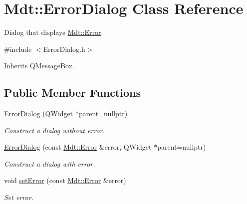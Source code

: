 \hypertarget{class_mdt_1_1_error_dialog}{}\section{Mdt\+:\+:Error\+Dialog Class Reference}
\label{class_mdt_1_1_error_dialog}


Dialog that displays \hyperlink{class_mdt_1_1_error}{Mdt\+::\+Error}.  




{\ttfamily \#include $<$Error\+Dialog.\+h$>$}



Inherits Q\+Message\+Box.

\subsection*{Public Member Functions}
\begin{DoxyCompactItemize}
\item 
\hyperlink{class_mdt_1_1_error_dialog_a75180123982c0d9261a51badd2cc8b35}{Error\+Dialog} (Q\+Widget $\ast$parent=nullptr)\hypertarget{class_mdt_1_1_error_dialog_a75180123982c0d9261a51badd2cc8b35}{}\label{class_mdt_1_1_error_dialog_a75180123982c0d9261a51badd2cc8b35}

\begin{DoxyCompactList}\small\item\em Construct a dialog without error. \end{DoxyCompactList}\item 
\hyperlink{class_mdt_1_1_error_dialog_a5f8bc28282e07d709cd9157bd4425d83}{Error\+Dialog} (const \hyperlink{class_mdt_1_1_error}{Mdt\+::\+Error} \&error, Q\+Widget $\ast$parent=nullptr)\hypertarget{class_mdt_1_1_error_dialog_a5f8bc28282e07d709cd9157bd4425d83}{}\label{class_mdt_1_1_error_dialog_a5f8bc28282e07d709cd9157bd4425d83}

\begin{DoxyCompactList}\small\item\em Construct a dialog with error. \end{DoxyCompactList}\item 
void \hyperlink{class_mdt_1_1_error_dialog_a7b946187592ea21ecefcc278b237f63b}{set\+Error} (const \hyperlink{class_mdt_1_1_error}{Mdt\+::\+Error} \&error)\hypertarget{class_mdt_1_1_error_dialog_a7b946187592ea21ecefcc278b237f63b}{}\label{class_mdt_1_1_error_dialog_a7b946187592ea21ecefcc278b237f63b}

\begin{DoxyCompactList}\small\item\em Set error. \end{DoxyCompactList}\end{DoxyCompactItemize}


